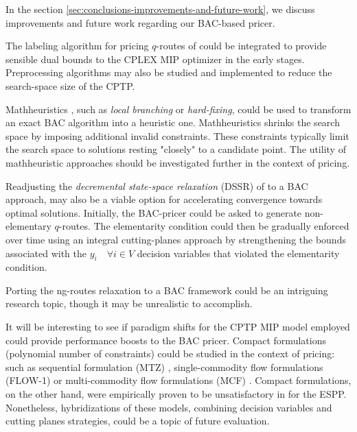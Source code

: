 In the section \cref{sec:conclusions-improvements-and-future-work}, we discuss improvements and future work regarding our BAC-based pricer.

The labeling algorithm for pricing $q$-routes of \textcite{desrochers1992} could be integrated to provide sensible dual bounds to the CPLEX MIP optimizer in the early stages.
Preprocessing algorithms may also be studied and implemented to reduce the search-space size of the CPTP.

Mathheuristics \parencite{fischetti2018}, such as \textit{local branching} \parencite{fischetti2003} or \textit{hard-fixing}, could be used to transform an exact BAC algorithm into a heuristic one.
Mathheuristics shrinks the search space by imposing additional invalid constraints.
These constraints typically limit the search space to solutions resting "closely" to a candidate point.
The utility of mathheuristic approaches should be investigated further in the context of pricing.

Readjusting the \textit{decremental state-space relaxation} (DSSR) of \textcite{boland2006, righini2008, martinelli2014} to a BAC approach, may also be a viable option for accelerating convergence towards optimal solutions.
Initially, the BAC-pricer could be asked to generate non-elementary $q$-routes.
The elementarity condition could then be gradually enforced over time using an integral cutting-planes approach by strengthening the bounds associated with the $y_i \quad \forall i \in V$ decision variables that violated the elementarity condition.

Porting the ng-routes relaxation \parencite{baldacci2011} to a BAC framework could be an intriguing research topic, though it may be unrealistic to accomplish.


It will be interesting to see if paradigm shifts for the CPTP MIP model employed could provide performance boosts to the BAC pricer. Compact formulations (polynomial number of constraints) could be studied in the context of pricing: such as sequential formulation (MTZ) \parencite{miller1960}, single-commodity flow formulations (FLOW-1) \parencite{gavish1978travelling} or multi-commodity flow formulations (MCF) \parencite{wong1980integer,claus1984new}.
Compact formulations, on the other hand, were empirically proven to be unsatisfactory in \textcite{taccari2016} for the ESPP. Nonetheless, hybridizations of these models, combining decision variables and cutting planes strategies, could be a topic of future evaluation.




